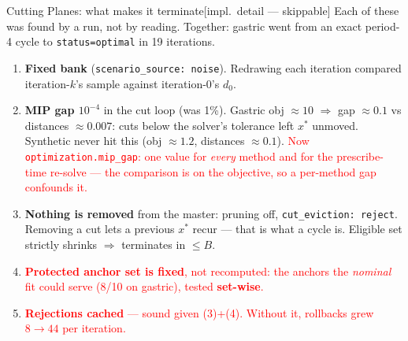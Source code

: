 \documentclass{beamer}
\newcommand{\implnote}{\hfill{\normalfont\scriptsize\color{gray}[impl.\ detail --- skippable]}}
\newcommand{\mc}[1]{\textcolor{red}{#1}}
\begin{document}
\begin{frame}{Cutting Planes: what makes it terminate\implnote}
  \small
  Each of these was found by a run, not by reading. Together: gastric went from an
  exact period-4 cycle to \texttt{status=optimal} in 19 iterations.
  \begin{enumerate}
    \item \textbf{Fixed bank} (\texttt{scenario\_source: noise}). Redrawing each
      iteration compared iteration-$k$'s sample against iteration-0's $d_0$.
    \item \textbf{MIP gap $10^{-4}$} in the cut loop (was 1\%). Gastric obj
      ${\approx}10$ $\Rightarrow$ gap ${\approx}0.1$ vs distances ${\approx}0.007$:
      cuts below the solver's tolerance left $x^\ast$ unmoved. Synthetic never hit
      this (obj ${\approx}1.2$, distances ${\approx}0.1$). \mc{Now
      \texttt{optimization.mip\_gap}: one value for \emph{every} method and for the
      prescribe-time re-solve --- the comparison is on the objective, so a
      per-method gap confounds it.}
    \item \textbf{Nothing is removed} from the master: pruning off,
      \texttt{cut\_eviction: reject}. Removing a cut lets a previous $x^\ast$ recur
      --- that is what a cycle is. Eligible set strictly shrinks
      $\Rightarrow$ terminates in $\le B$.
    \item \mc{\textbf{Protected anchor set is fixed}, not recomputed: the anchors the
      \emph{nominal} fit could serve (8/10 on gastric), tested \textbf{set-wise}.}
    \item \mc{\textbf{Rejections cached} --- sound given (3)+(4). Without it, rollbacks
      grew $8\to44$ per iteration.}
  \end{enumerate}
\end{frame}
\end{document}
